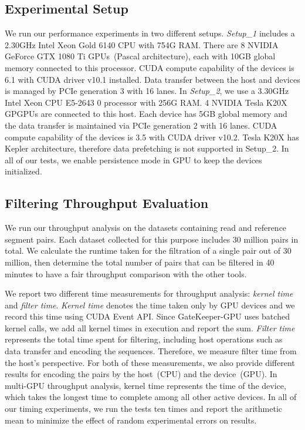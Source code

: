 \subsection{Experimental Setup}
We run our performance experiments in two different setups. \textit{Setup\_1} includes a 2.30GHz Intel Xeon Gold 6140 CPU with 754G RAM. There are 8 NVIDIA GeForce GTX 1080 Ti GPUs~(Pascal architecture), each with 10GB global memory connected to this processor. CUDA compute capability of the devices is 6.1 with CUDA driver v10.1 installed. Data transfer between the host and devices is managed by PCIe generation 3 with 16 lanes. In \textit{Setup\_2}, we use a 3.30GHz Intel Xeon CPU E5-2643 0 processor with 256G RAM. 4 NVIDIA Tesla K20X GPGPUs are connected to this host. Each device has 5GB global memory and the data transfer is maintained via PCIe generation 2 with 16 lanes. CUDA compute capability of the devices is 3.5 with CUDA driver v10.2. Tesla K20X has Kepler architecture, therefore data prefetching is not supported in Setup\_2. In all of our tests, we enable persistence mode in GPU to keep the devices initialized.

\subsection{Filtering Throughput Evaluation}
We run our throughput analysis on the datasets containing read and reference segment pairs. Each dataset collected for this purpose includes 30 million pairs in total. We calculate the runtime taken for the filtration of a single pair out of 30 million, then determine the total number of pairs that can be filtered in 40 minutes to have a fair throughput comparison with the other tools. 

We report two different time measurements for throughput analysis: \textit{kernel time} and \textit{filter time}. \textit{Kernel time} denotes the time taken only by GPU devices and we record this time using CUDA Event API. Since GateKeeper-GPU uses batched kernel calls, we add all kernel times in execution and report the sum. \textit{Filter time} represents the total time spent for filtering, including host operations such as data transfer and encoding the sequences. Therefore, we measure filter time from the host's perspective. For both of these measurements, we also provide different results for encoding the pairs by the host~(CPU) and the device~(GPU). In multi-GPU throughput analysis, kernel time represents the time of the device, which takes the longest time to complete among all other active devices. In all of our timing experiments, we run the tests ten times and report the arithmetic mean to minimize the effect of random experimental errors on results. 

